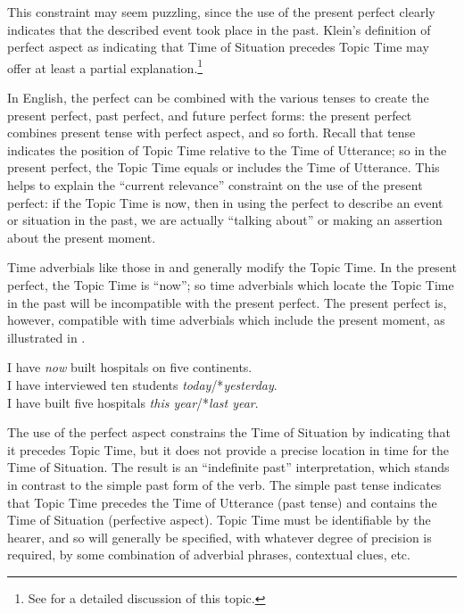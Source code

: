 This constraint may seem puzzling, since the use of the present perfect clearly indicates that the described event took place in the past. Klein’s definition of perfect aspect as indicating that Time of Situation precedes Topic Time may offer at least a partial explanation.\footnote{See \citet{Klein1992} for a detailed discussion of this topic.}



In English, the perfect can be combined with the various tenses to create the present perfect, past perfect, and future perfect forms: the present perfect combines present tense with perfect aspect, and so forth. Recall that tense indicates the position of Topic Time relative to the Time of Utterance; so in the present perfect, the Topic Time equals or includes the Time of Utterance. This helps to explain the “current relevance” constraint on the use of the present perfect: if the Topic Time is now, then in using the perfect to describe an event or situation in the past, we are actually “talking about” or making an assertion about the present moment.



Time adverbials like those in  and  generally modify the Topic Time. In the present perfect, the Topic Time is “now”; so time adverbials which locate the Topic Time in the past will be incompatible with the present perfect. The present perfect is, however, compatible with time adverbials which include the present moment, as illustrated in .


\ea \label{ex:22.9}
\ea I have \textit{now} built hospitals on five continents.\\
\ex I have interviewed ten students \textit{today}/*\textit{yesterday}.\\
\ex I have built five hospitals \textit{this year}/*\textit{last year}.
                       \z
\z
\newpage 

The use of the perfect aspect constrains the Time of Situation by indicating that it precedes Topic Time, but it does not provide a precise location in time for the Time of Situation. The result is an “indefinite past” interpretation, which stands in contrast to the simple past form of the verb. The simple past tense indicates that Topic Time precedes the Time of Utterance (past tense) and contains the Time of Situation (perfective aspect). Topic Time must be identifiable by the hearer, and so will generally be specified, with whatever degree of precision is required, by some combination of adverbial phrases, contextual clues, etc.



